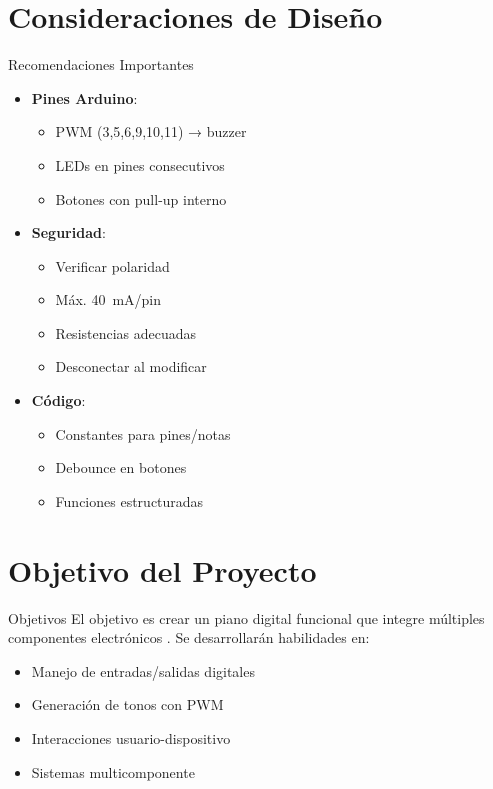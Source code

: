 \section{Consideraciones de Diseño}
\begin{componentBox}{Recomendaciones Importantes \citep{banzi2009getting}}
	\begin{itemize}[leftmargin=*,itemsep=1pt,parsep=1pt]
		\item \textbf{Pines Arduino}:
		\begin{itemize}[itemsep=0pt,parsep=0pt]
			\item PWM (3,5,6,9,10,11) → buzzer
			\item LEDs en pines consecutivos
			\item Botones con pull-up interno
		\end{itemize}
		\item \textbf{Seguridad}:
		\begin{itemize}[itemsep=0pt,parsep=0pt]
			\item Verificar polaridad
			\item Máx. \SI{40}{\milli\ampere}/pin
			\item Resistencias adecuadas
			\item Desconectar al modificar
		\end{itemize}
		\item \textbf{Código}:
		\begin{itemize}[itemsep=0pt,parsep=0pt]
			\item Constantes para pines/notas
			\item Debounce en botones
			\item Funciones estructuradas
		\end{itemize}
	\end{itemize}
\end{componentBox}

\section{Objetivo del Proyecto}
\begin{componentBox}{Objetivos}
	El objetivo es crear un piano digital funcional que integre múltiples componentes electrónicos \citep{evans2011arduino}. Se desarrollarán habilidades en:
	\begin{itemize}[leftmargin=*,itemsep=1pt]
		\item Manejo de entradas/salidas digitales
		\item Generación de tonos con PWM
		\item Interacciones usuario-dispositivo
		\item Sistemas multicomponente
	\end{itemize}
\end{componentBox}